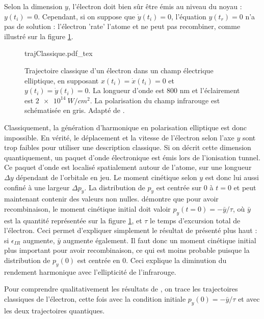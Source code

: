 Selon la dimension $y$, l'électron doit bien sûr être émis au niveau du noyau : $y(t_i) = 0$. Cependant, si on suppose que $\dot{y}(t_i) = 0$, l'équation $y(t_r) = 0$ n'a pas de solution : l'électron 'rate' l'atome et ne peut pas recombiner, comme illustré sur la figure \ref{fig:ellgruson}.

\begin{figure}[!ht]
\centering
\def\svgwidth{0.7\columnwidth}
{trajClassique.pdf_tex}
\caption{Trajectoire classique d'un électron dans un champ électrique elliptique, en supposant $x(t_i) = \dot{x}(t_i) = 0$ et $y(t_i) = \dot{y}(t_i) = 0$. La longueur d'onde est 800 nm et l'éclairement est $\SI{2e14}{W/cm^2}$. La polarisation du champ infrarouge est schématisée en gris. Adapté de .}
\label{fig:ellgruson}
\end{figure}

Classiquement, la génération d'harmonique en polarisation elliptique est donc impossible. En vérité, le déplacement et la vitesse de l'électron selon l'axe $y$ sont trop faibles pour utiliser une description classique. Si on décrit cette dimension quantiquement, un paquet d'onde électronique est émis lors de l'ionisation tunnel. Ce paquet d'onde est localisé spatialement autour de l'atome, sur une longueur $\Delta y$ dépendant de l'orbitale en jeu. Le moment cinétique selon $y$ est donc lui aussi confiné à une largeur $\Delta p_y$. La distribution de $p_y$ est centrée sur 0 à $t=0$ et peut maintenant contenir des valeurs non nulles.  démontre que pour avoir recombinaison, le moment cinétique initial doit valoir $p_y(t=0) = -\bar{y}/\tau$, où $\bar{y}$ est la quantité représentée sur la figure \ref{fig:ellgruson}, et $\tau$ le temps d'excursion total de l'électron. Ceci permet d'expliquer simplement le résultat de  présenté plus haut : si $\epsilon_{IR}$ augmente, $\bar{y}$ augmente également. Il faut donc un moment cinétique initial plus important pour avoir recombinaison, ce qui est moins probable puisque la distribution de $p_y(0)$ est centrée en 0. Ceci explique la diminution du rendement harmonique avec l'ellipticité de l'infrarouge.

Pour comprendre qualitativement les résultats de , on trace les trajectoires classiques de l'électron, cette fois avec la condition initiale $p_y(0) = -\bar{y}/\tau$ et avec les deux trajectoires quantiques.

